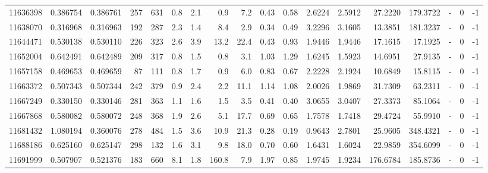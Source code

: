\begin{tabular}{rrrrrrrrrrrrrrrlrr}
  11636398 & 0.386754 &   0.386761 &  257 &  631 &      0.8 &      2.1 &     0.9 &      7.2 &       0.43 &        0.58 &  2.6224 &  2.5912 &   27.2220 &  179.3722 &             - &        0 &         -1 \\
  11638070 & 0.316968 &   0.316963 &  192 &  287 &      2.3 &      1.4 &     8.4 &      2.9 &       0.34 &        0.49 &  3.2296 &  3.1605 &   13.3851 &  181.3237 &             - &        0 &         -1 \\
  11644471 & 0.530138 &   0.530110 &  226 &  323 &      2.6 &      3.9 &    13.2 &     22.4 &       0.43 &        0.93 &  1.9446 &  1.9446 &   17.1615 &   17.1925 &             - &        0 &         -1 \\
  11652004 & 0.642491 &   0.642489 &  209 &  317 &      0.8 &      1.5 &     0.8 &      3.1 &       1.03 &        1.29 &  1.6245 &  1.5923 &   14.6951 &   27.9135 &             - &        0 &         -1 \\
  11657158 & 0.469653 &   0.469659 &   87 &  111 &      0.8 &      1.7 &     0.9 &      6.0 &       0.83 &        0.67 &  2.2228 &  2.1924 &   10.6849 &   15.8115 &             - &        0 &         -1 \\
  11663372 & 0.507343 &   0.507344 &  242 &  379 &      0.9 &      2.4 &     2.2 &     11.1 &       1.14 &        1.08 &  2.0026 &  1.9869 &   31.7309 &   63.2311 &             - &        0 &         -1 \\
  11667249 & 0.330150 &   0.330146 &  281 &  363 &      1.1 &      1.6 &     1.5 &      3.5 &       0.41 &        0.40 &  3.0655 &  3.0407 &   27.3373 &   85.1064 &             - &        0 &         -1 \\
  11667868 & 0.580082 &   0.580072 &  248 &  368 &      1.9 &      2.6 &     5.1 &     17.7 &       0.69 &        0.65 &  1.7578 &  1.7418 &   29.4724 &   55.9910 &             - &        0 &         -1 \\
  11681432 & 1.080194 &   0.360076 &  278 &  484 &      1.5 &      3.6 &    10.9 &     21.3 &       0.28 &        0.19 &  0.9643 &  2.7801 &   25.9605 &  348.4321 &             - &        0 &         -1 \\
  11688186 & 0.625160 &   0.625147 &  298 &  132 &      1.6 &      3.1 &     9.8 &     18.0 &       0.70 &        0.60 &  1.6431 &  1.6024 &   22.9859 &  354.6099 &             - &        0 &         -1 \\
  11691999 & 0.507907 &   0.521376 &  183 &  660 &      8.1 &      1.8 &   160.8 &      7.9 &       1.97 &        0.85 &  1.9745 &  1.9234 &  176.6784 &  185.8736 &             - &        0 &         -1 \\

\end{tabular}
